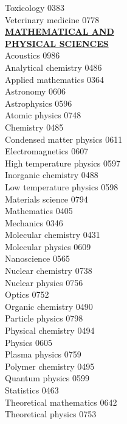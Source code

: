 \documentclass[9pt]{article}
\newcommand{\categoryheading}[1]{{\fontsize{8}{11}\selectfont \textbf{\uline{#1}}}}
\begin{document}
\begin{multicols}{3}
Toxicology \hfill 0383 \leavevmode \\
Veterinary medicine \hfill 0778 \leavevmode \\
\clearpage
\categoryheading{MATHEMATICAL AND \leavevmode \\
PHYSICAL SCIENCES} \leavevmode \\
Acoustics \hfill 0986 \leavevmode \\
Analytical chemistry \hfill 0486 \leavevmode \\
Applied mathematics \hfill 0364 \leavevmode \\
Astronomy \hfill 0606 \leavevmode \\
Astrophysics \hfill 0596 \leavevmode \\
Atomic physics \hfill 0748 \leavevmode \\
Chemistry \hfill 0485 \leavevmode \\
Condensed matter physics \hfill 0611 \leavevmode \\
Electromagnetics \hfill 0607 \leavevmode \\
High temperature physics \hfill 0597 \leavevmode \\
Inorganic chemistry \hfill 0488 \leavevmode \\
Low temperature physics \hfill 0598 \leavevmode \\
Materials science \hfill 0794 \leavevmode \\
Mathematics \hfill 0405 \leavevmode \\
Mechanics \hfill 0346 \leavevmode \\
Molecular chemistry \hfill 0431 \leavevmode \\
Molecular physics \hfill 0609 \leavevmode \\
Nanoscience \hfill 0565 \leavevmode \\
Nuclear chemistry \hfill 0738 \leavevmode \\
Nuclear physics \hfill 0756 \leavevmode \\
Optics \hfill 0752 \leavevmode \\
Organic chemistry \hfill 0490 \leavevmode \\
Particle physics \hfill 0798 \leavevmode \\
Physical chemistry \hfill 0494 \leavevmode \\
Physics \hfill 0605 \leavevmode \\
Plasma physics \hfill 0759 \leavevmode \\
Polymer chemistry \hfill 0495 \leavevmode \\
Quantum physics \hfill 0599 \leavevmode \\
Statistics \hfill 0463 \leavevmode \\
Theoretical mathematics \hfill 0642 \leavevmode \\
Theoretical physics \hfill 0753 \leavevmode \\
\columnbreak
\columnbreak
\end{multicols}
\end{document}
